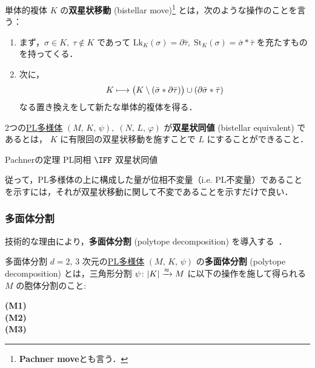 \documentclass[TQFT_main]{subfiles}
\begin{document}
単体的複体 $K$ の\textbf{双星状移動} (bistellar move)\footnote{\textbf{Pachner move}とも言う．} とは，次のような操作のことを言う：
\begin{enumerate}
    \item まず，$\sigma \in K,\; \tau \notin K$ であって $\mathrm{Lk}_K (\sigma) = \partial \bar{\tau},\; \mathrm{St}_K (\sigma) = \bar{\sigma} * \bar{\tau}$ を充たすものを持ってくる．
    \item 次に，
    \begin{align}
        K \longmapsto \bigl(K \setminus (\bar{\sigma} * \partial \bar{\tau}) \bigr) \cup (\partial \bar{\sigma} * \bar{\tau})
    \end{align}
    なる置き換えをして新たな単体的複体を得る．
\end{enumerate}
2つの\hyperref[def:PLmfd]{PL多様体} $(M,\, K,\, \psi),\; (N,\, L,\, \varphi)$ が\textbf{双星状同値} (bistellar equivalent) であるとは，
$K$ に有限回の双星状移動を施すことで $L$ にすることができること．

\begin{mytheo}[label=thm:Pachner]{Pachnerの定理}
    PL同相 $\IFF$ 双星状同値
\end{mytheo}

従って，PL多様体の上に構成した量が位相不変量（i.e. PL不変量）であることを示すには，それが双星状移動に関して不変であることを示すだけで良い．

\subsubsection{多面体分割}

技術的な理由により，\textbf{多面体分割} (polytope decomposition) を導入する~\cite[p.11]{KirillovBalsam2010TVBW}．

\begin{mydef}[label=def:polytope-decomp]{多面体分割}
    $d = 2,\, 3$ 次元の\hyperref[def:PLmfd]{PL多様体} $(M,\, K,\, \psi)$ の\textbf{多面体分割} (polytope decomposition) とは，三角形分割 $\psi \colon \abs{K} \xrightarrow{\approx} M$ に以下の操作を施して得られる $M$ の胞体分割のこと:
    \begin{description}
        \item[\textbf{(M1)}] 
        \item[\textbf{(M2)}] 
        \item[\textbf{(M3)}] 
    \end{description}
\end{mydef}
\end{document}
